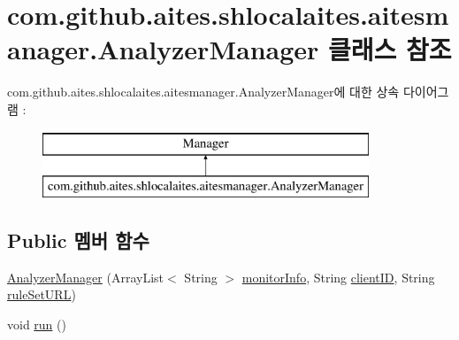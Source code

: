 \hypertarget{classcom_1_1github_1_1aites_1_1shlocalaites_1_1aitesmanager_1_1_analyzer_manager}{}\section{com.\+github.\+aites.\+shlocalaites.\+aitesmanager.\+Analyzer\+Manager 클래스 참조}
\label{classcom_1_1github_1_1aites_1_1shlocalaites_1_1aitesmanager_1_1_analyzer_manager}
com.\+github.\+aites.\+shlocalaites.\+aitesmanager.\+Analyzer\+Manager에 대한 상속 다이어그램 \+: \begin{figure}[H]
\begin{center}
\leavevmode
\includegraphics[height=2.000000cm]{classcom_1_1github_1_1aites_1_1shlocalaites_1_1aitesmanager_1_1_analyzer_manager}
\end{center}
\end{figure}
\subsection*{Public 멤버 함수}
\begin{DoxyCompactItemize}
\item 
\mbox{\hyperlink{classcom_1_1github_1_1aites_1_1shlocalaites_1_1aitesmanager_1_1_analyzer_manager_afb105caa43f6a8b8dac34b82fe2dd5fb}{Analyzer\+Manager}} (Array\+List$<$ String $>$ \mbox{\hyperlink{classcom_1_1github_1_1aites_1_1shlocalaites_1_1aitesmanager_1_1_analyzer_manager_a158935ea553bae7475409e5a065d6576}{monitor\+Info}}, String \mbox{\hyperlink{classcom_1_1github_1_1aites_1_1shlocalaites_1_1aitesmanager_1_1_analyzer_manager_a4c88d935af5617842aecd9686483de67}{client\+ID}}, String \mbox{\hyperlink{classcom_1_1github_1_1aites_1_1shlocalaites_1_1aitesmanager_1_1_analyzer_manager_af225145a9ef067c87f773bbef60ec5d8}{rule\+Set\+U\+RL}})
\item 
void \mbox{\hyperlink{classcom_1_1github_1_1aites_1_1shlocalaites_1_1aitesmanager_1_1_analyzer_manager_abba2aecdbbcf6675496f814109cb21a4}{run}} ()
\end{DoxyCompactItemize}
